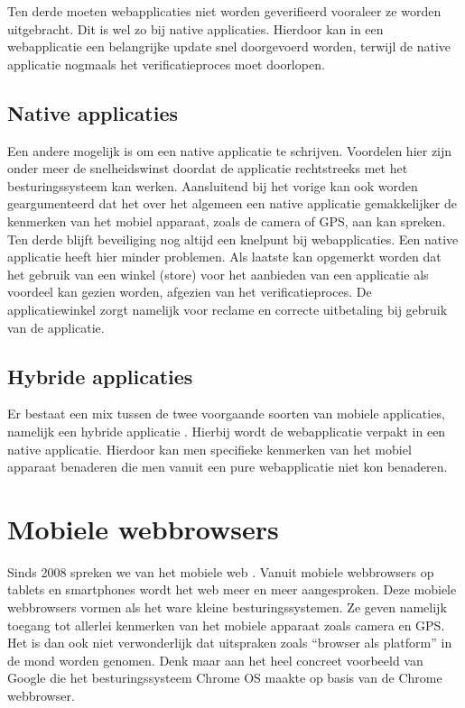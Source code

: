 Ten derde moeten webapplicaties niet worden geverifieerd vooraleer ze worden uitgebracht. Dit is wel zo bij native applicaties. Hierdoor kan in een webapplicatie een belangrijke update snel doorgevoerd worden, terwijl de native applicatie nogmaals het verificatieproces moet doorlopen.

\subsection{Native applicaties}
Een andere mogelijk is om een native applicatie te schrijven. Voordelen \cite{Accenture2012} hier zijn onder meer de snelheidswinst doordat de applicatie rechtstreeks met het besturingssysteem kan werken. Aansluitend bij het vorige kan ook worden geargumenteerd dat het over het algemeen een native applicatie gemakkelijker de kenmerken van het mobiel apparaat, zoals de camera of GPS, aan kan spreken. Ten derde blijft beveiliging nog altijd een knelpunt bij webapplicaties. Een native applicatie heeft hier minder problemen. Als laatste kan opgemerkt worden dat het gebruik van een winkel (store) voor het aanbieden van een applicatie als voordeel kan gezien worden, afgezien van het verificatieproces. De applicatiewinkel zorgt namelijk voor reclame en correcte uitbetaling bij gebruik van de applicatie.

\subsection{Hybride applicaties}
Er bestaat een mix tussen de twee voorgaande soorten van mobiele applicaties, namelijk een hybride applicatie \cite{Accenture2012}. Hierbij wordt de webapplicatie verpakt in een native applicatie. Hierdoor kan men specifieke kenmerken van het mobiel apparaat benaderen die men vanuit een pure webapplicatie niet kon benaderen.


\section{Mobiele webbrowsers}
\label{sec:mobiele-webbrowsers}
Sinds 2008 spreken we van het mobiele web \cite{Hales2012}. Vanuit mobiele webbrowsers op tablets en smartphones wordt het web meer en meer aangesproken. Deze mobiele webbrowsers vormen als het ware kleine besturingssystemen. Ze geven namelijk toegang tot allerlei kenmerken van het mobiele apparaat zoals camera en GPS. Het is dan ook niet verwonderlijk dat uitspraken zoals “browser als platform” in de mond worden genomen. Denk maar aan het heel concreet voorbeeld van Google die het besturingssysteem Chrome OS maakte op basis van de Chrome webbrowser.

